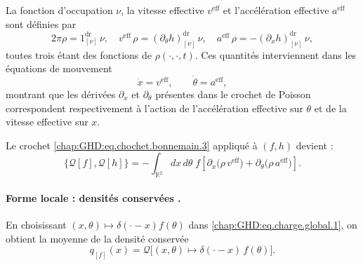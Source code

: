 La fonction d’occupation $\nu$, la vitesse effective $v^{\mathrm{eff}}$ et l’accélération effective $a^{\mathrm{eff}}$ sont définies par
\begin{equation}\label{chap:GHD:eq.nu.v.a.1}
	2 \pi \rho =  1^{\mathrm{dr}}_{[\nu]} \, \nu , 
	\quad v^{\mathrm{eff}} \, \rho  =(\partial_\theta h )^{\mathrm{dr}}_{[\nu]} \, \nu , 
	\quad a^{\mathrm{eff}} \, \rho  = -(\partial_x h )^{\mathrm{dr}}_{[\nu]}\, \nu ,
\end{equation}
toutes trois étant des fonctions de $\rho(\cdot,\cdot,t)$. Ces quantités interviennent dans les équations de mouvement
\begin{equation}
	\dot{x} = v^{\mathrm{eff}}, \qquad \dot{\theta} = a^{\mathrm{eff}},
\end{equation}
montrant que les dérivées $\partial_x$ et $\partial_\theta$ présentes dans le crochet de Poisson correspondent respectivement à l'action de l'accélération effective sur $\theta$ et de la vitesse effective sur $x$.

\medskip 

Le crochet \eqref{chap:GHD:eq.chochet.bonnemain.3} appliqué à $(f,h)$ devient :
\begin{equation}\label{chap:GHD:eq.chochet.bonnemain.4}
	\{\mathcal{Q}[f], \mathcal{Q}[h]\} 
	= - \int_{\mathbb{R}^2} dx\, d\theta \; f \left[ \partial_x \big( \rho \, v^{\mathrm{eff}} \big) 
	+ \partial_\theta \big( \rho \, a^{\mathrm{eff}} \big) \right].
\end{equation}

\paragraph{Forme locale : densités conservées .} 
En choisissant $(x,\theta) \mapsto \delta(\cdot - x)f(\theta)$ dans \eqref{chap:GHD:eq.charge.global.1}, on obtient la moyenne de la densité conservée \ie
\begin{equation}
	q_{[f]}(x) = \mathcal{Q} \big[ (x,\theta) \mapsto \delta(\cdot - x) \, f(\theta) \big].
\end{equation}

